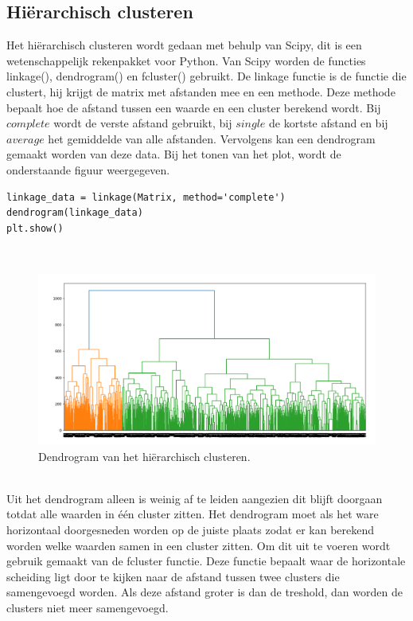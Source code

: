 \subsection{Hiërarchisch clusteren}
Het hiërarchisch clusteren wordt gedaan met behulp van Scipy, dit is een wetenschappelijk rekenpakket voor Python. Van Scipy worden de functies linkage(), dendrogram() en fcluster() gebruikt. De linkage functie is de functie die clustert, hij krijgt de matrix met afstanden mee en een methode. Deze methode bepaalt hoe de afstand tussen een waarde en een cluster berekend wordt. Bij $complete$ wordt de verste afstand gebruikt, bij $single$ de kortste afstand en bij $average$ het gemiddelde van alle afstanden. Vervolgens kan een dendrogram gemaakt worden van deze data. Bij het tonen van het plot, wordt de onderstaande figuur weergegeven.
\\\indent
\begin{lstlisting}
linkage_data = linkage(Matrix, method='complete')
dendrogram(linkage_data)
plt.show()
\end{lstlisting}
\\\indent
\begin{figure}[h]
    \centering
    \includegraphics[width=0.7\linewidth]{../foto's/dendogram}
    \caption{Dendrogram van het hiërarchisch clusteren.}
    \label{fig:dendrogram}
\end{figure}
\\\indent
Uit het dendrogram alleen is weinig af te leiden aangezien dit blijft doorgaan totdat alle waarden in één cluster zitten. Het dendrogram moet als het ware horizontaal doorgesneden worden op de juiste plaats zodat er kan berekend worden welke waarden samen in een cluster zitten. Om dit uit te voeren wordt gebruik gemaakt van de fcluster functie. Deze functie bepaalt waar de horizontale scheiding ligt door te kijken naar de afstand tussen twee clusters die samengevoegd worden. Als deze afstand groter is dan de treshold, dan worden de clusters niet meer samengevoegd.
\\\indent

